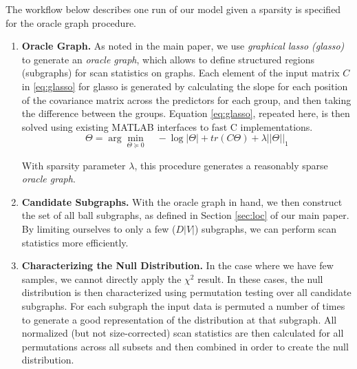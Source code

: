 The workflow below describes one run of our model given a sparsity is specified for the oracle graph procedure.
\begin{enumerate}
\item \textbf{Oracle Graph.} As noted in the main paper, we use \textit{graphical lasso (glasso)} to generate an \textit{oracle graph}, which allows to define structured regions (subgraphs) for scan statistics on graphs. 
Each element of the input matrix $C$ in \eqref{eq:glasso} for glasso is generated by  calculating the slope for each position of the covariance matrix across the predictors for each group, and then taking the difference between the groups.
Equation \eqref{eq:glasso}, repeated here, is then solved using existing MATLAB interfaces to fast C implementations.
\begin{equation}
\Theta = \arg\min_{\Theta \succeq 0} \quad -\log|\Theta| + tr(C\Theta) + \lambda||\Theta||_{1}
\end{equation}

With sparsity parameter $\lambda$, this procedure generates a reasonably sparse \textit{oracle graph}.

\item \textbf{Candidate Subgraphs.} With the oracle graph in hand, we then construct the set of all ball subgraphs, as defined in Section \ref{sec:loc} of our main paper. By limiting ourselves to only a few ($D|V|$) subgraphs, we can perform scan statistics more efficiently.

\item \textbf{Characterizing the Null Distribution.} In the case where we have few samples, we cannot directly apply the $\chi^2$ result. In these cases, the null distribution is then characterized using permutation testing over all candidate subgraphs. For each subgraph the input data is permuted a number of times to generate a good representation of the distribution at that subgraph. All normalized (but not size-corrected) scan statistics are then calculated for all permutations across all subsets and then combined in order to create the null distribution.


\end{enumerate}
